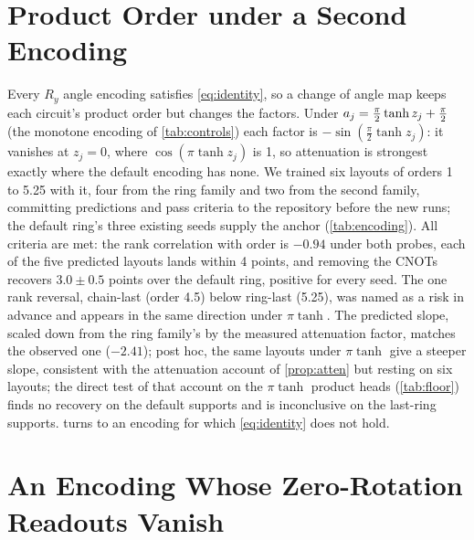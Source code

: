 \section{Product Order under a Second Encoding}
\label{app:encoding}

Every $R_y$ angle encoding satisfies \cref{eq:identity}, so a change of angle map keeps each
circuit's product order but changes the factors. Under $a_{j}=\tfrac{\pi}{2}\tanh z_j+\tfrac{\pi}{2}$
(the monotone encoding of \cref{tab:controls}) each factor is $-\sin(\tfrac{\pi}{2}\tanh z_j)$: it
vanishes at $z_j=0$, where $\cos(\pi\tanh z_j)$ is 1, so attenuation is strongest exactly where the
default encoding has none. We trained six layouts of orders 1 to 5.25 with it, four from the ring
family and two from the second family, committing predictions and pass criteria to the repository
before the new runs; the default ring's three existing seeds supply the anchor (\cref{tab:encoding}).
All criteria are met: the rank correlation with order is $-0.94$ under both probes, each of the five
predicted layouts lands within 4 points, and removing the CNOTs recovers $3.0\pm0.5$ points over
the default ring, positive for every seed. The one rank reversal, chain-last (order 4.5) below
ring-last (5.25), was named as a risk in advance and appears in the same direction under
$\pi\tanh$. The predicted slope, scaled down from the ring family's by the measured attenuation
factor, matches the observed one ($-2.41$); post hoc, the same layouts under $\pi\tanh$ give a
steeper slope, consistent with the attenuation account of \cref{prop:atten} but resting on six
layouts; the direct test of that account on the $\pi\tanh$ product heads (\cref{tab:floor}) finds
no recovery on the default supports and is inconclusive on the last-ring supports.  turns to an encoding for which \cref{eq:identity} does not hold.



\section{An Encoding Whose Zero-Rotation Readouts Vanish}
\label{app:phase}

